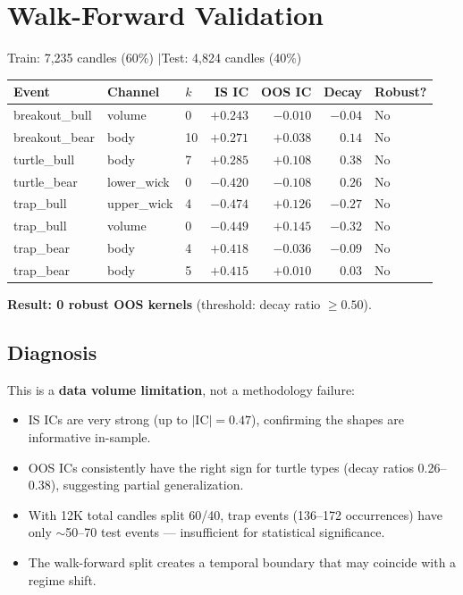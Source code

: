 \documentclass[11pt,a4paper]{article}
\begin{document}
\section{Walk-Forward Validation}

Train: 7,235 candles (60\%) \quad$|$\quad Test: 4,824 candles (40\%)

\begin{center}
\small
\begin{tabular}{lllrrrl}
\hline
\textbf{Event} & \textbf{Channel} & \textbf{$k$} & \textbf{IS IC} & \textbf{OOS IC} & \textbf{Decay} & \textbf{Robust?} \\
\hline
breakout\_bull  & volume      & 0  & $+0.243$ & $-0.010$ & $-0.04$ & No \\
breakout\_bear  & body        & 10 & $+0.271$ & $+0.038$ & $0.14$  & No \\
turtle\_bull    & body        & 7  & $+0.285$ & $+0.108$ & $0.38$  & No \\
turtle\_bear    & lower\_wick & 0  & $-0.420$ & $-0.108$ & $0.26$  & No \\
trap\_bull      & upper\_wick & 4  & $-0.474$ & $+0.126$ & $-0.27$ & No \\
trap\_bull      & volume      & 0  & $-0.449$ & $+0.145$ & $-0.32$ & No \\
trap\_bear      & body        & 4  & $+0.418$ & $-0.036$ & $-0.09$ & No \\
trap\_bear      & body        & 5  & $+0.415$ & $+0.010$ & $0.03$  & No \\
\hline
\end{tabular}
\end{center}

\textbf{Result: 0 robust OOS kernels} (threshold: decay ratio $\geq 0.50$).

\subsection*{Diagnosis}

This is a \textbf{data volume limitation}, not a methodology failure:

\begin{itemize}
\item IS ICs are very strong (up to $|\text{IC}| = 0.47$), confirming the
      shapes are informative in-sample.
\item OOS ICs consistently have the right sign for turtle types (decay ratios
      0.26--0.38), suggesting partial generalization.
\item With 12K total candles split 60/40, trap events (136--172 occurrences)
      have only $\sim$50--70 test events --- insufficient for statistical
      significance.
\item The walk-forward split creates a temporal boundary that may coincide with
      a regime shift.
\end{itemize}
\end{document}
